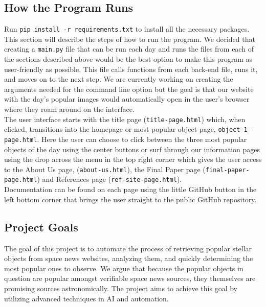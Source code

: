\documentclass[12pt,letterpaper]{article}
\begin{document}
\subsection*{How the Program Runs}

Run \texttt{pip install -r requirements.txt} to install all the necessary packages.\\


This section will describe the steps of how to run the program. We  decided that 
creating a \texttt{main.py} file that can be run each day and runs the files from 
each of the sections described above would be the best option to make this program 
as user-friendly as possible. This file calls functions from each back-end file, 
runs it, and moves on to the next step. We are currently working on creating the 
arguments needed for the command line option but the goal is that our website with 
the day's popular images would automatically open in the user's browser where they 
roam around on the interface.\\

The user interface starts with the title page (\texttt{title-page.html}) which, when 
clicked, transitions into the homepage or most popular object page,
\texttt{object-1-page.html}. Here the user can choose to click between the three most 
popular objects of the day using the center buttons or surf through our information 
pages using the drop across the menu in the top right corner which gives the user access 
to the About Us page, (\texttt{about-us.html}), the Final Paper page
 (\texttt{final-paper-page.html}) and References page (\texttt{ref-site-page.html}). \\

Documentation can be found on each page using the little GitHub button in the left bottom corner that brings the user straight to the public GitHub repository. \\



\subsection*{Project Goals}
The goal of this project is to automate the process of retrieving popular stellar objects 
from space news websites, analyzing them, and quickly determining the most popular ones to 
observe. We argue that because the popular objects in question are popular amongst
verifiable space news sources, they themselves are promising sources astronomically. 
The project aims to achieve this goal by utilizing advanced techniques in AI and 
automation.\\
\end{document}
